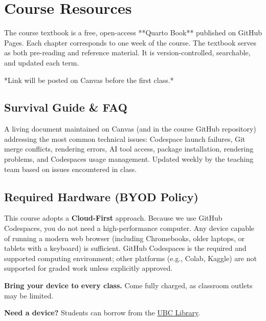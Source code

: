 \documentclass[
  letterpaper,
  DIV=11,
  numbers=noendperiod,
  oneside]{scrreprt}
\begin{document}
\section{Course Resources}\label{course-resources}

\begin{tcolorbox}[colback=brandlight!5!white, colframe=brandblue, title=\textbf{Online Textbook (OER)}, arc=2mm]
The course textbook is a free, open-access **Quarto Book** published on GitHub Pages. Each chapter corresponds to one week of the course. The textbook serves as both pre-reading and reference material. It is version-controlled, searchable, and updated each term.

*Link will be posted on Canvas before the first class.*
\end{tcolorbox}

\subsection{Survival Guide \& FAQ}\label{survival-guide-faq}

A living document maintained on Canvas (and in the course GitHub
repository) addressing the most common technical issues: Codespace
launch failures, Git merge conflicts, rendering errors, AI tool access,
package installation, rendering problems, and Codespaces usage
management. Updated weekly by the teaching team based on issues
encountered in class.

\subsection{Required Hardware (BYOD
Policy)}\label{required-hardware-byod-policy}

This course adopts a \textbf{Cloud-First} approach. Because we use
GitHub Codespaces, you do not need a high-performance computer. Any
device capable of running a modern web browser (including Chromebooks,
older laptops, or tablets with a keyboard) is sufficient. GitHub
Codespaces is the required and supported computing environment; other
platforms (e.g., Colab, Kaggle) are not supported for graded work unless
explicitly approved.

\textbf{Bring your device to every class.} Come fully charged, as
classroom outlets may be limited.

\textbf{Need a device?} Students can borrow from the
\href{https://services.library.ubc.ca/computers-technology/technology-borrowing/}{UBC
Library}.
\end{document}
